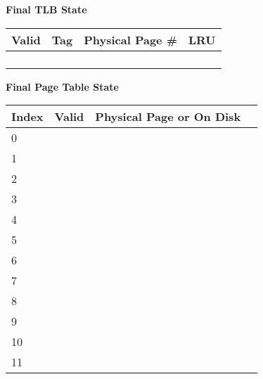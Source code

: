 \documentclass{exam}
\begin{document}
\begin{questions}
\begin{multicols}{2}
        \textbf{Final TLB State}

        \def\arraystretch{1.5}%
        \begin{tabular}{|l|l|l|l|}
            \hline
            \textbf{Valid} & \textbf{Tag} & \textbf{Physical Page \#} & \textbf{LRU} \\
            \hline
            & & & \\
            \hline
            & & & \\
            \hline
            & & & \\
            \hline
            & & & \\
            \hline
        \end{tabular}

        \columnbreak

        \textbf{Final Page Table State}

        \def\arraystretch{1.5}%
        \begin{tabular}{|l|l|l|l|}
            \hline
            \textbf{Index} & \textbf{Valid} & \textbf{Physical Page or On Disk} \\
            \hline
            0 & & \\
            \hline
            1 & & \\
            \hline
            2 & & \\
            \hline
            3 & & \\
            \hline
            4 & & \\
            \hline
            5 & & \\
            \hline
            6 & & \\
            \hline
            7 & & \\
            \hline
            8 & & \\
            \hline
            9 & & \\
            \hline
            10 & & \\
            \hline
            11 & & \\
            \hline
        \end{tabular}
    \end{multicols}

\end{questions}
\end{document}
